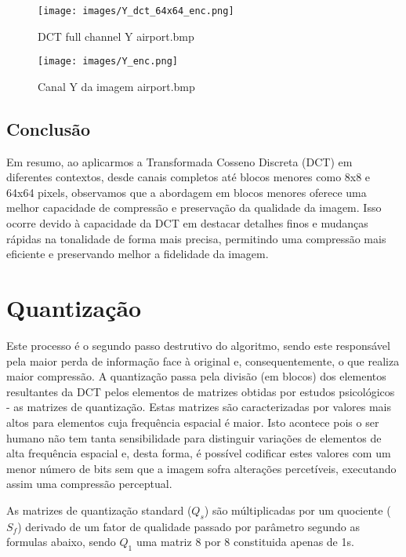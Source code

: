 \documentclass{article}
\begin{document}
\begin{figure} [H]  %
  \centering
  \begin{minipage}[b]{0.49\textwidth}
    \centering
    \texttt{[image: images/Y\_dct\_64x64\_enc.png]}
    \caption{DCT full channel Y airport.bmp}
    \label{fig:imagem1}
  \end{minipage}
  \hfill
  \begin{minipage}[b]{0.49\textwidth}
    \centering
    \texttt{[image: images/Y\_enc.png]}
    \caption{Canal Y da imagem airport.bmp}
    \label{fig:imagem2}
  \end{minipage}
\end{figure}

\subsection{Conclusão}

Em resumo, ao aplicarmos a Transformada Cosseno Discreta (DCT) em diferentes contextos, desde canais completos até blocos menores como 8x8 e 64x64 pixels, observamos que a abordagem em blocos menores oferece uma melhor capacidade de compressão e preservação da qualidade da imagem. Isso ocorre devido à capacidade da DCT em destacar detalhes finos e mudanças rápidas na tonalidade de forma mais precisa, permitindo uma compressão mais eficiente e preservando melhor a fidelidade da imagem.

\newpage
\section{Quantização}

Este processo é o segundo passo destrutivo do algoritmo, sendo este responsável pela maior perda de informação face à original e, consequentemente, o que realiza maior compressão.
A quantização passa pela divisão (em blocos) dos elementos resultantes da DCT pelos elementos de matrizes obtidas por estudos psicológicos - as matrizes de quantização. Estas matrizes são caracterizadas por valores mais altos para elementos cuja frequência espacial é maior. Isto acontece pois o ser humano não tem tanta sensibilidade para distinguir variações de elementos de alta frequência espacial e, desta forma, é possível codificar estes valores com um menor número de bits sem que a imagem sofra alterações percetíveis, executando assim uma compressão perceptual.

As matrizes de quantização standard ($Q_s$) são múltiplicadas por um quociente ($S_f$) derivado de um fator de qualidade passado por parâmetro segundo as formulas abaixo, sendo $Q_1$ uma matriz 8 por 8 constituida apenas de 1s.
\end{document}
